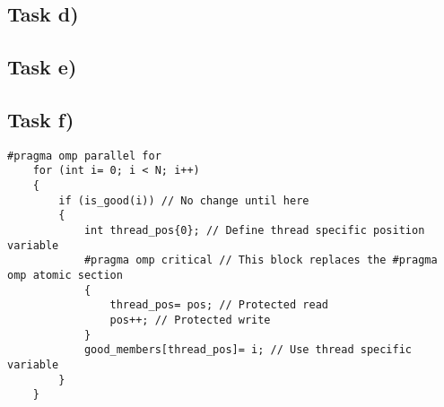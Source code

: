 \documentclass[11pt,a4paper]{article}
\begin{document}
\subsection{Task d)}

\subsection{Task e)}

\subsection{Task f)}

\begin{lstlisting}[float, caption={Proposed modification for correctness in task 2.}, label={lst1}]
    #pragma omp parallel for
    for (int i= 0; i < N; i++)
    {
        if (is_good(i)) // No change until here
        {
            int thread_pos{0}; // Define thread specific position variable
            #pragma omp critical // This block replaces the #pragma omp atomic section
            {
                thread_pos= pos; // Protected read
                pos++; // Protected write
            }
            good_members[thread_pos]= i; // Use thread specific variable
        }
    }
\end{lstlisting}


%
%
%	
%
%
%

%
\end{document}
